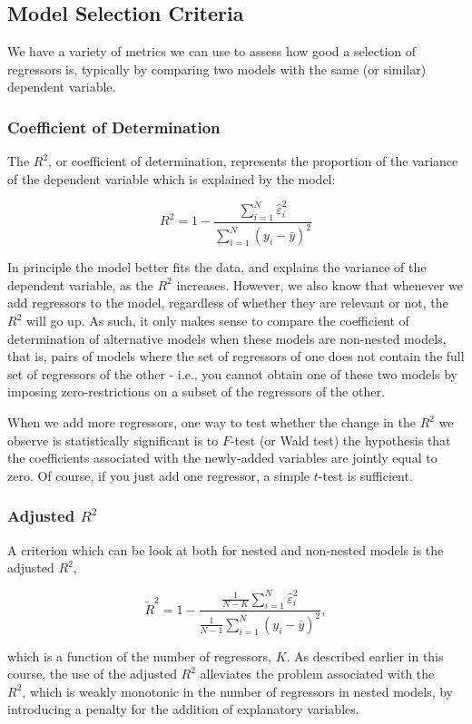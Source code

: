 \subsection{Model Selection Criteria}
We have a variety of metrics we can use to assess how good a selection of regressors is, typically by comparing two models with the same (or similar) dependent variable.

\subsubsection{Coefficient of Determination}
The $R^{2}$, or coefficient of determination, represents the proportion of the variance of the dependent variable which is explained by the model:

$$
R^{2}=1-\frac{\sum_{i=1}^{N} \widehat{\varepsilon}_{i}^{2}}{\sum_{i=1}^{N}\left(y_{i}-\bar{y}\right)^{2}}
$$

In principle the model better fits the data, and explains the variance of the dependent variable, as the $R^{2}$ increases. However, we also know that whenever we add regressors to the model, regardless of whether they are relevant or not, the $R^{2}$ will go up. As such, it only makes sense to compare the coefficient of determination of alternative models when these models are non-nested models, that is, pairs of models where the set of regressors of one does not contain the full set of regressors of the other - i.e., you cannot obtain one of these two models by imposing zero-restrictions on a subset of the regressors of the other.

When we add more regressors, one way to test whether the change in the $R^{2}$ we observe is statistically significant is to $F$-test (or Wald test) the hypothesis that the coefficients associated with the newly-added variables are jointly equal to zero. Of course, if you just add one regressor, a simple $t$-test is sufficient.

\subsubsection{Adjusted $R^{2}$}
A criterion which can be look at both for nested and non-nested models is the adjusted $R^{2}$,

$$
\tilde{R}^{2}=1-\frac{\frac{1}{N-K} \sum_{i=1}^{N} \widehat{\varepsilon}_{i}^{2}}{\frac{1}{N-1} \sum_{i=1}^{N}\left(y_{i}-\bar{y}\right)^{2}},
$$

which is a function of the number of regressors, $K$. As described earlier in this course, the use of the adjusted $R^{2}$ alleviates the problem associated with the\\
$R^{2}$, which is weakly monotonic in the number of regressors in nested models, by introducing a penalty for the addition of explanatory variables.

